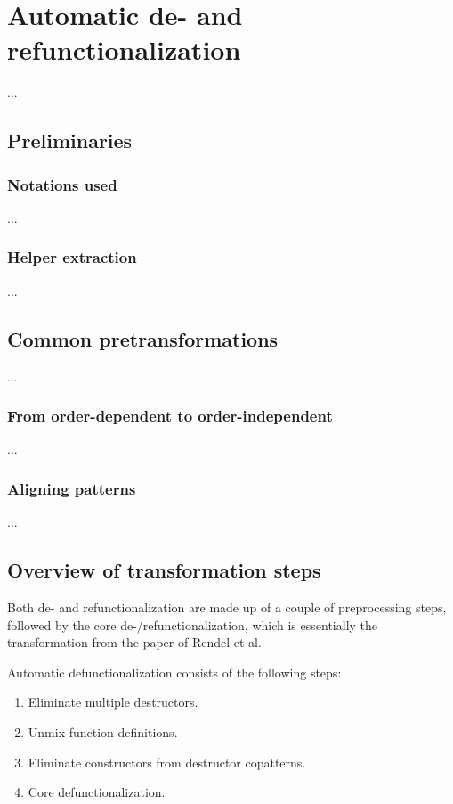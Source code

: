 \chapter{Automatic de- and refunctionalization}

...

\section{Preliminaries}

\subsection{Notations used}

...

\subsection{Helper extraction}

...

\section{Common pretransformations}

...

\subsection{From order-dependent to order-independent}

...

\subsection{Aligning patterns}

...

\section{Overview of transformation steps}

Both de- and refunctionalization are made up of a couple of preprocessing steps, followed by the core de-/refunctionalization, which is essentially the transformation from the paper of Rendel et al.

Automatic defunctionalization consists of the following steps:
\begin{enumerate}
\item Eliminate multiple destructors.

\item Unmix function definitions.

\item Eliminate constructors from destructor copatterns.

\item Core defunctionalization.

\end{enumerate}

